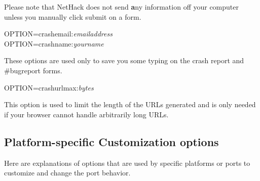\documentclass[titlepage]{article}
\begin{document}
Please note that NetHack does not send {\textbf any} information off your
computer unless you manually click submit on a form.
\begin{description}
\item[OPTION=crash\textunderscore email:\textit{email\textunderscore address}]
\item[OPTION=crash\textunderscore name:\textit{your\textunderscore name}]
\end{description}
These options are used only to save you some typing on the crash
report and \#bugreport forms.
\begin{description}
\item[OPTION=crash\textunderscore urlmax:\textit{bytes}]
\end{description}
This option is used to limit the length of the URLs generated and is only
needed if your browser cannot handle arbitrarily long URLs.

\subsection*{Platform-specific Customization options}

Here are explanations of options that are used by specific platforms
or ports to customize and change the port behavior.
\end{document}

